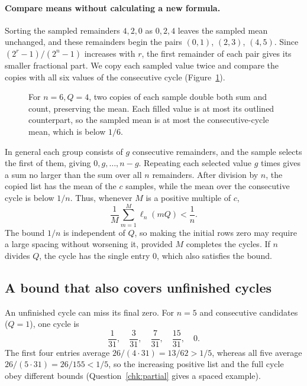 \documentclass[10pt]{article}
\theoremstyle{plain}
\theoremstyle{definition}
\theoremstyle{remark}
\newcommand{\lft}{\ell}
\begin{document}
\paragraph{Compare means without calculating a new formula.}
Sorting the sampled remainders $4,2,0$ as $0,2,4$ leaves the sampled
mean unchanged, and these remainders begin the pairs $(0,1)$, $(2,3)$,
$(4,5)$. Since \mbox{$(2^r-1)/(2^n-1)$} increases with $r$, the first
remainder of each pair gives its smaller fractional part. We copy each
sampled value twice and compare the copies with all six values of the
consecutive cycle (Figure~\ref{fig:cycle-mean}).

\begin{figure}[htbp]
\centering

\caption{For $n=6,Q=4$, two copies of each sample double
both sum and count, preserving the mean. Each filled value is at most its
outlined counterpart, so the sampled mean is at most the consecutive-cycle
mean, which is below $1/6$.}
\label{fig:cycle-mean}
\end{figure}
\begin{samepage}
In general each group consists of $g$ consecutive remainders, and the
sample selects the first of them, giving $0,g,\dots,n-g$. Repeating each
selected value $g$ times gives a sum no larger than the sum over all
$n$ remainders. After division by $n$, the copied list has the mean of
the $c$ samples, while the mean over the consecutive cycle is below
$1/n$. Thus, whenever $M$ is a positive multiple of $c$,
\begin{equation}\label{eq:cycle-main}
 \frac1M\sum_{m=1}^{M}\lft_n(mQ)<\frac1n.
\end{equation}
The bound $1/n$ is independent of $Q$, so making the initial rows zero
may require a large spacing without worsening it, provided $M$ completes
the cycles. If $n$ divides $Q$, the cycle has the single entry $0$,
which also satisfies the bound.\par
\end{samepage}

\pagebreak[0]
\begin{samepage}
\subsection{A bound that also covers unfinished cycles}\label{sec:unfinished}

An unfinished cycle can miss its final zero. For $n=5$ and consecutive
candidates ($Q=1$), one cycle is
\[
 \frac1{31},\quad\frac3{31},\quad\frac7{31},\quad\frac{15}{31},\quad0.
\]
The first four entries average $26/(4\cdot31)=13/62>1/5$, whereas all
five average $26/(5\cdot31)=26/155<1/5$, so the increasing positive
list and the full cycle obey different bounds
(Question~\ref{chk:partial} gives a spaced example).\par
\end{samepage}
\end{document}
